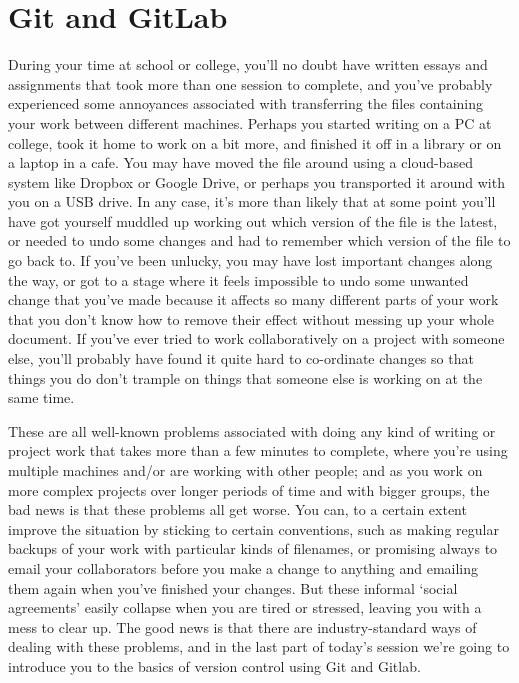 
\section{Git and GitLab}

During your time at school or college, you'll no doubt have written essays and assignments that took more than one session to complete, and you've probably experienced some annoyances associated with transferring the files containing your work between different machines. Perhaps you started writing on a PC at college, took it home to work on a bit more, and finished it off in a library or on a laptop in a cafe. You may have moved the file around using a cloud-based system like Dropbox or Google Drive, or perhaps you transported it around with you on a USB drive. In any case, it's more than likely that at some point you'll have got yourself muddled up working out which version of the file is the latest, or needed to undo some changes and had to remember which version of the file to go back to. If you've been unlucky, you may have lost important changes along the way, or got to a stage where it feels impossible to undo some unwanted change that you've made because it affects so many different parts of your work that you don't know how to remove their effect without messing up your whole document. If you've ever tried to work collaboratively on a project with someone else, you'll probably have found it quite hard to co-ordinate changes so that things you do don't trample on things that someone else is working on at the same time. 

These are all well-known problems associated with doing any kind of writing or project work that takes more than a few minutes to complete, where you're using multiple machines and/or are working with other people; and as you work on more complex projects over longer periods of time and with bigger groups, the bad news is that these problems all get worse. You can, to a certain extent improve the situation by sticking to certain conventions, such as making regular backups of your work with particular kinds of filenames, or promising always to email your collaborators before you make a change to anything and emailing them again when you've finished your changes. But these informal `social agreements' easily collapse when you are tired or stressed, leaving you with a mess to clear up. The good news is that there are industry-standard ways of dealing with these problems, and in the last part of today's session we're going to introduce you to the basics of version control using Git and Gitlab. 

